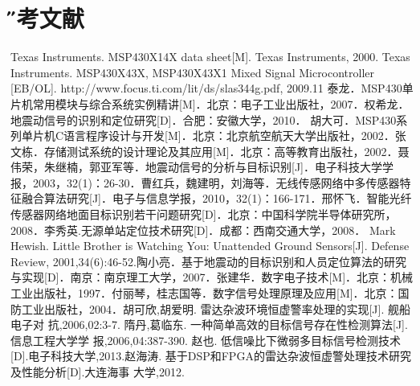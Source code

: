 \documentclass[12pt,a4paper]{article} %
\newcommand{\xiaosanhao}{\fontsize{15pt}{\baselineskip}\selectfont}    %
\begin{document}
    \section{\xiaosanhao \H 参考文献}
    \noindent
 [1]  Texas Instruments. MSP430X14X data sheet[M]. Texas  Instruments, 2000. \newline
  [2] Texas Instruments. MSP430X43X, MSP430X43X1 Mixed Signal Microcontroller [EB/OL]. http://www.focus.ti.com/lit/ds/slas344g.pdf, 2009.11 \newline
   [3]  泰龙．MSP430单片机常用模块与综合系统实例精讲[M]．北京：电子工业出版社，2007．\newline
[4]  权希龙．地震动信号的识别和定位研究[D]．合肥：安徽大学，2010．
\newline
 [5]  胡大可．MSP430系列单片机C语言程序设计与开发[M]．北京：北京航空航天大学出版社，2002．\newline
 [6]  张文栋．存储测试系统的设计理论及其应用[M]．北京：高等教育出版社，2002．\newline
[7]  聂伟荣，朱继楠，郭亚军等．地震动信号的分析与目标识别[J]．电子科技大学学报，2003，32(1)：26-30．\newline
 [8]  曹红兵，魏建明，刘海等．无线传感网络中多传感器特征融合算法研究[J]．电子与信息学报，2010，32(1)：166-171．\newline
[9]  邢怀飞．智能光纤传感器网络地面目标识别若干问题研究[D]．北京：中国科学院半导体研究所，2008．\newline
[10]  李秀英.无源单站定位技术研究[D]．成都：西南交通大学，2008．
\newline
 [11]  Mark Hewish. Little Brother is Watching You: Unattended Ground Sensors[J]. Defense Review, 2001,34(6):46-52.\newline
 [12]  陶小亮．基于地震动的目标识别和人员定位算法的研究与实现[D]．南京：南京理工大学，2007．\newline
 [13]  张建华．数字电子技术[M]．北京：机械工业出版社，1997．\newline
 [14]  付丽琴，桂志国等．数字信号处理原理及应用[M]．北京：国防工业出版社，2004．\newline
 [15]胡可欣,胡爱明. 雷达杂波环境恒虚警率处理的实现[J]. 舰船电子对 抗,2006,02:3-7. \newline
[16]隋丹,葛临东. 一种简单高效的目标信号存在性检测算法[J]. 信息工程大学学 报,2006,04:387-390. \newline
[17]赵也. 低信噪比下微弱多目标信号检测技术[D].电子科技大学,2013.\newline
[18]赵海涛. 基于DSP和FPGA的雷达杂波恒虚警处理技术研究及性能分析[D].大连海事 大学,2012.\newline
\end{document}
